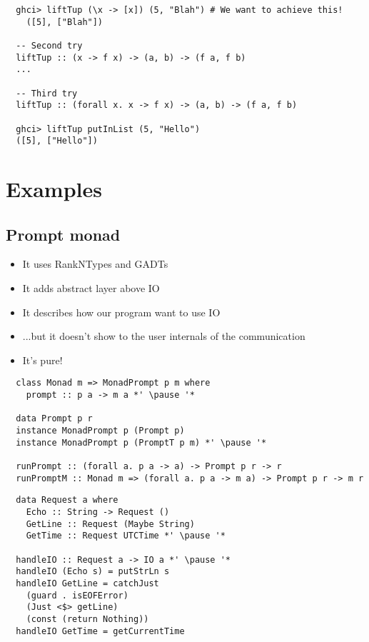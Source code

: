 \documentclass[aspectratio=43]{beamer}
\begin{document}
\begin{frame}[fragile]
 \begin{lstlisting}
  ghci> liftTup (\x -> [x]) (5, "Blah") # We want to achieve this!
    ([5], ["Blah"])
    
  -- Second try
  liftTup :: (x -> f x) -> (a, b) -> (f a, f b)
  ...
  
  -- Third try
  liftTup :: (forall x. x -> f x) -> (a, b) -> (f a, f b)
  
  ghci> liftTup putInList (5, "Hello")
  ([5], ["Hello"])
 \end{lstlisting} 
\end{frame}


\section{Examples}

\subsection{Prompt monad}

\begin{frame}[fragile]
 \begin{itemize}
  \item It uses RankNTypes and GADTs
  \pause
  \item It adds abstract layer above IO
  \pause
  \item It describes how our program want to use IO
  \item ...but it doesn't show to the user internals of the communication
  \pause
  \item It's pure!
 \end{itemize}
\end{frame}


\begin{frame}[fragile]
 \begin{lstlisting}
  class Monad m => MonadPrompt p m where
    prompt :: p a -> m a *' \pause '*
    
  data Prompt p r
  instance MonadPrompt p (Prompt p)
  instance MonadPrompt p (PromptT p m) *' \pause '*
  
  runPrompt :: (forall a. p a -> a) -> Prompt p r -> r
  runPromptM :: Monad m => (forall a. p a -> m a) -> Prompt p r -> m r
 \end{lstlisting}
\end{frame}
  
\begin{frame}[fragile]
 \begin{lstlisting}  
  data Request a where
    Echo :: String -> Request ()
    GetLine :: Request (Maybe String)
    GetTime :: Request UTCTime *' \pause '*

  handleIO :: Request a -> IO a *' \pause '*
  handleIO (Echo s) = putStrLn s
  handleIO GetLine = catchJust
    (guard . isEOFError)
    (Just <$> getLine)
    (const (return Nothing))
  handleIO GetTime = getCurrentTime
 \end{lstlisting}
\end{frame}
\end{document}
